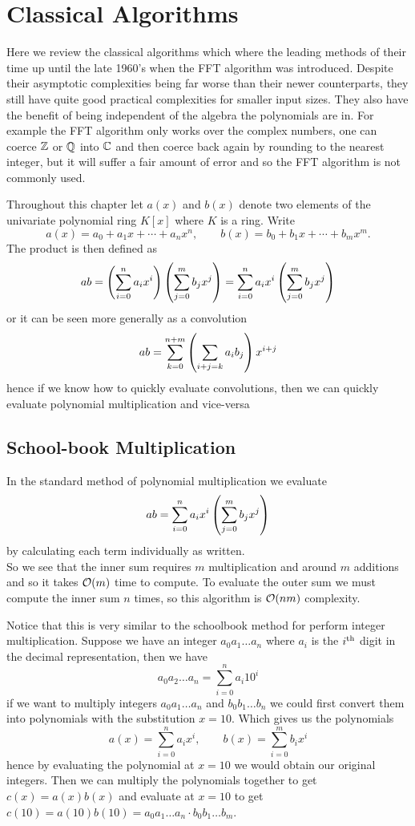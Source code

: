 \chapter{Classical Algorithms}\label{classical algorithms}

Here we review the classical algorithms which where the leading methods of their time up until the late 1960's when the FFT algorithm was introduced. Despite their asymptotic complexities being far worse than their newer counterparts, they still have quite good practical complexities for smaller input sizes. They also have the benefit of being independent of the algebra the polynomials are in. For example the FFT algorithm only works over the complex numbers, one can coerce ${\mathbb Z}$ or ${\mathbb Q}$ into ${\mathbb C}$ and then coerce back again by rounding to the nearest integer, but it will suffer a fair amount of error and so the FFT algorithm is not commonly used.

Throughout this chapter let $a(x)$ and $b(x)$ denote two elements of the univariate polynomial ring $K[x]$ where $K$ is a ring.
Write
\[
    a(x) = a_0 + a_1x + \cdots + a_nx^n, \qquad b(x) = b_0 + b_1x + \cdots + b_mx^m.
\]
The product is then defined as
\[
    ab = \left(\sum^n_{i=0} a_i x^i\right)\left(\sum^m_{j=0} b_j x^j\right) = \sum^n_{i=0} a_ix^i\left(\sum^m_{j=0} b_j x^j\right)
\]
or it can be seen more generally as a convolution
\[
    ab = \sum^{n + m}_{k=0} \left(\sum_{i + j = k}a_ib_j\right) x^{i + j}
\]
hence if we know how to quickly evaluate convolutions, then we can quickly evaluate polynomial multiplication and vice-versa

\section{School-book Multiplication}
\label{sec:prelim-schoolbook}

In the standard method of polynomial multiplication we evaluate
\[
    ab = \sum^n_{i=0} a_ix^i\left(\sum^m_{j=0} b_j x^j\right)
\]
by calculating each term individually as written.\\
So we see that the inner sum requires $m$ multiplication and around $m$ additions and so it takes $\mathcal O(m)$ time to compute. To evaluate the outer sum we must compute the inner sum $n$ times, so this algorithm is $\mathcal O(nm)$ complexity.

Notice that this is very similar to the schoolbook method for perform integer multiplication. Suppose we have an integer $a_0a_1 \ldots a_n$ where $a_i$ is the $i^\textrm{th}$ digit in the decimal representation, then we have
\[
    a_0a_2 \ldots a_n = \sum^n_{i=0} a_i 10^i
\]
if we want to multiply integers $a_0a_1\ldots a_n$ and $b_0b_1\ldots b_n$ we could first convert them into polynomials with the substitution $x = 10$. Which gives us the polynomials
\[
    a(x) = \sum^n_{i=0} a_ix^i, \qquad b(x) = \sum^m_{i=0} b_ix^i
\]
hence by evaluating the polynomial at $x = 10$ we would obtain our original integers. Then we can multiply the polynomials together to get $c(x) = a(x)b(x)$ and evaluate at $x = 10$ to get $c(10) = a(10)b(10) = a_0a_1\ldots a_n \cdot b_0b_1\ldots b_m$.

